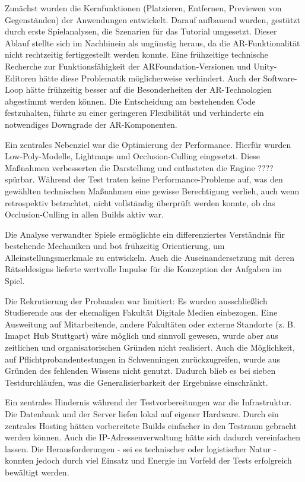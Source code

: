 Zunächst wurden die Kernfunktionen (Platzieren, Entfernen, Previewen von Gegenständen) der Anwendungen entwickelt. Darauf aufbauend wurden, gestützt durch erste Spielanalysen, die Szenarien für das Tutorial umgesetzt. Dieser Ablauf stellte sich im Nachhinein als ungünstig heraus, da die \ac{AR}-Funktionalität nicht rechtzeitig fertiggestellt werden konnte. Eine frühzeitige technische Recherche zur Funktionsfähigkeit der ARFoundation-Versionen und Unity-Editoren hätte diese Problematik möglicherweise verhindert. Auch der Software-Loop hätte frühzeitig besser auf die Besonderheiten der \ac{AR}-Technologien abgestimmt werden können. Die Entscheidung am bestehenden Code festzuhalten, führte zu einer geringeren Flexibilität und verhinderte ein notwendiges Downgrade der \ac{AR}-Komponenten.

Ein zentrales Nebenziel war die Optimierung der Performance. Hierfür wurden Low-Poly-Modelle, Lightmaps und Occlusion-Culling eingesetzt. Diese Maßnahmen verbesserten die Darstellung und entlasteten die Engine ???? spürbar. Während der Test traten keine Performance-Probleme auf, was den gewählten technischen Maßnahmen eine gewisse Berechtigung verlieh, auch wenn retrospektiv betrachtet, nicht vollständig überprüft werden konnte, ob das Occlusion-Culling in allen Builds aktiv war.

Die Analyse verwandter Spiele ermöglichte ein differenziertes Verständnis für bestehende Mechaniken und bot frühzeitig Orientierung, um Alleinstellungsmerkmale zu entwickeln. Auch die Auseinandersetzung mit deren Rätseldesigns lieferte wertvolle Impulse für die Konzeption der Aufgaben im Spiel.

Die Rekrutierung der Probanden war limitiert: Es wurden ausschließlich Studierende aus der ehemaligen Fakultät Digitale Medien einbezogen. Eine Ausweitung auf Mitarbeitende, andere Fakultäten oder externe Standorte (z. B. Imapct Hub Stuttgart) wäre möglich und sinnvoll gewesen, wurde aber aus zeitlichen und organisatorischen Gründen nicht realisiert. Auch die Möglichkeit, auf Pflichtprobandentestungen in Schwenningen zurückzugreifen, wurde aus Gründen des fehlenden Wissens nicht genutzt. Dadurch blieb es bei sieben Testdurchläufen, was die Generalisierbarkeit der Ergebnisse einschränkt.

Ein zentrales Hindernis während der Testvorbereitungen war die Infrastruktur. Die Datenbank und der Server liefen lokal auf eigener Hardware. Durch ein zentrales Hosting hätten vorbereitete Builds einfacher in den Testraum gebracht werden können. Auch die IP-Adressenverwaltung hätte sich dadurch vereinfachen lassen. Die Herausforderungen - sei es technischer oder logistischer Natur - konnten jedoch durch viel Einsatz und Energie im Vorfeld der Tests erfolgreich bewältigt werden.

